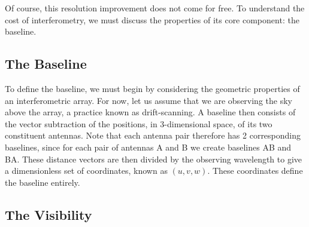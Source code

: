 \pg
Of course, this resolution improvement does not come for free. To understand the cost of interferometry, we must discuss the properties of its core component: the baseline.

\subsection{The Baseline}

\pg
To define the baseline, we must begin by considering the geometric properties of an interferometric array. For now, let us assume that we are observing the sky above the array, a practice known as drift-scanning. A baseline then consists of the vector subtraction of the positions, in 3-dimensional space, of its two constituent antennas. Note that each antenna pair therefore has 2 corresponding baselines, since for each pair of antennas A and B we create baselines AB and BA. These distance vectors are then divided by the observing wavelength to give a dimensionless set of coordinates, known as $(u,v,w)$. These coordinates define the baseline entirely. 

\subsection{The Visibility}


